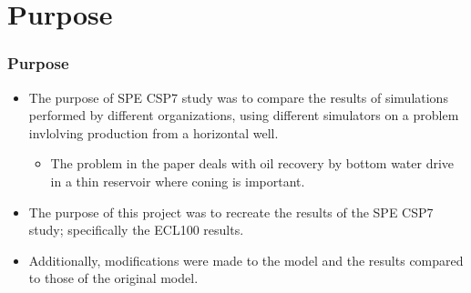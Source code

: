 \section{Purpose}
\begin{frame}
    \frametitle{Purpose}
    \begin{itemize}
        \item The purpose of SPE CSP7 study was to compare the results of simulations performed by different organizations, using different simulators on a problem invlolving production from a horizontal well.
        \begin{itemize}
            \item The problem in the paper deals with oil recovery by bottom water drive in a thin reservoir where coning is important.
        \end{itemize}
        \item The purpose of this project was to recreate the results of the SPE CSP7 study; specifically the ECL100 results.
        \item Additionally, modifications were made to the model and the results compared to those of the original model.
    \end{itemize}
\end{frame}
